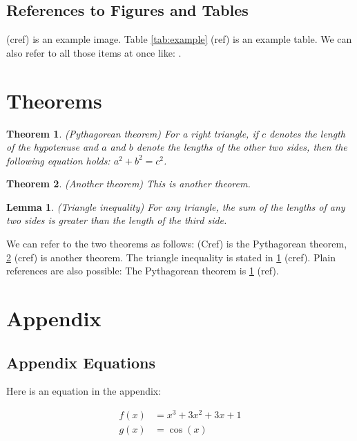 \documentclass{article}
\newtheorem{thm}{Theorem}
\newtheorem{lem}{Lemma}
\begin{document}
\subsection{References to Figures and Tables}
 (cref) is an example image. Table \ref{tab:example} (ref) is an example table. We can also refer to all those items at once like: .

\section{Theorems}

\begin{thm}
    \label{thm:pythagorean}
    (Pythagorean theorem) For a right triangle, if $c$ denotes the length of the hypotenuse and $a$ and $b$ denote the lengths of the other two sides, then the following equation holds: $a^2 + b^2 = c^2$.
\end{thm}

\begin{thm}
    \label{thm:another}
    (Another theorem) This is another theorem.
\end{thm}


\begin{lem}
    \label{lem:triangle_inequality}
    (Triangle inequality) For any triangle, the sum of the lengths of any two sides is greater than the length of the third side.
\end{lem}

We can refer to the two theorems as follows:  (Cref) is the Pythagorean theorem, \cref{thm:another} (cref) is another theorem. The triangle inequality is stated in \cref{lem:triangle_inequality} (cref). Plain references are also possible: The Pythagorean theorem is \ref{thm:pythagorean} (ref).

\appendix

\section{Appendix}

\subsection{Appendix Equations}
Here is an equation in the appendix:

\begin{equation}
    \begin{aligned}
        f(x) &= x^3 + 3x^2 + 3x + 1 \\
        g(x) &= \cos(x)
    \end{aligned}
    \label{eq:cubic}
\end{equation}
\end{document}
